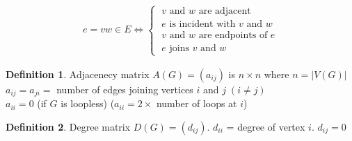 \documentclass{article}
\theoremstyle{definition}
\newtheorem{defn}{Definition}[]
\begin{document}
\begin{align*}
    e = vw \in E \Leftrightarrow 
    \begin{cases}
       \; v \text{ and } w \text{ are adjacent} \\ 
       \; e \text{ is incident with } v \text{ and } w \\
       \; v \text{ and } w \text{ are endpoints of } e \\ 
       \; e \text{ joins } v \text{ and } w
    \end{cases}
\end{align*}
\begin{defn}
Adjacenecy matrix $A(G) = (a_{ij})$ is $n\times n$ where $n=\vert V(G) \vert$ \\ 
$a_{ij} = a_{ji} = $ number of edges joining vertices $i$ and $j \; (i \ne j)$ \\ 
$a_{ii} = 0$ (if $G$ is loopless) ($a_{ii} = 2 \times $ number of loops at $i$)
\end{defn}
\begin{defn}
    Degree matrix $D(G) = (d_{ij})$.
    $d_{ii}$ = degree of vertex $i$. $d_{ij} = 0$
    \end{defn}
    
\end{document}
